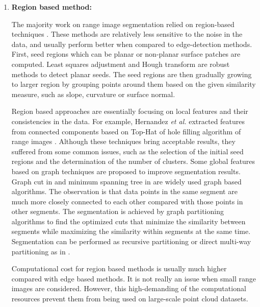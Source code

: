 \begin{enumerate}
\item {\bf Region based method:}

The majority work on range image segmentation relied on
region-based techniques \cite{MS_XW,MS_RHV,MS_PV}.
These methods are relatively less sensitive to the noise in the data,
and usually perform better when compared to edge-detection methods.
First, seed regions which can be planar or non-planar
surface patches are computed.
Least squares adjustment and Hough transform are robust methods
to detect planar seeds.
The seed regions are then gradually growing to larger region
by grouping points around them based on the given similarity measure,
such as slope, curvature or surface normal.

Region based approaches are essentially focusing on local features
and their consistencies in the data.
For example, Hernandez {\it et al.} extracted features from connected components
based on Top-Hat of hole filling algorithm of range images \cite{MS_HMP}.
Although these techniques bring acceptable results,
they suffered from some common issues,
such as the selection of the initial seed regions
and the determination of the number of clusters.
Some global features based on graph techniques are proposed to improve
segmentation results.
Graph cut in \cite{MS_SM,MS_BK} and minimum spanning tree in \cite{MS_HK}
are widely used graph based algorithms.
The observation is that data points in the same segment
are much more closely connected to each other
compared with those points in other segments.
The segmentation is achieved by graph partitioning algorithms to
find the optimized cuts that minimize the similarity between segments
while maximizing the similarity within segments at the same time.
Segmentation can be performed as recursive partitioning
or direct multi-way partitioning as in \cite{MS_SZ}.

Computational cost for region based methods is usually much higher
compared with edge based methods.
It is not really an issue when small range images are considered.
However, this high-demanding of the computational resources prevent
them from being used on large-scale point cloud datasets.

\end{enumerate}



